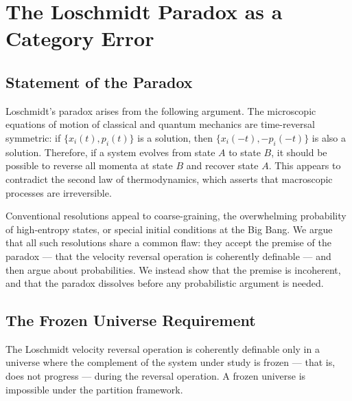 
\section{The Loschmidt Paradox as a Category Error}
\label{sec:loschmidt}

\subsection{Statement of the Paradox}
\label{subsec:paradox_statement}

Loschmidt's paradox arises from the following argument. The microscopic equations
of motion of classical and quantum mechanics are time-reversal symmetric: if
$\{x_i(t), p_i(t)\}$ is a solution, then $\{x_i(-t), -p_i(-t)\}$ is also a
solution. Therefore, if a system evolves from state $A$ to state $B$, it should
be possible to reverse all momenta at state $B$ and recover state $A$. This
appears to contradict the second law of thermodynamics, which asserts that
macroscopic processes are irreversible.

Conventional resolutions appeal to coarse-graining, the overwhelming probability
of high-entropy states, or special initial conditions at the Big Bang. We argue
that all such resolutions share a common flaw: they accept the premise of the
paradox --- that the velocity reversal operation is coherently definable --- and
then argue about probabilities. We instead show that the premise is incoherent,
and that the paradox dissolves before any probabilistic argument is needed.

\subsection{The Frozen Universe Requirement}
\label{subsec:frozen}

\begin{theorem}
\label{thm:frozen}
The Loschmidt velocity reversal operation is coherently definable only in a
universe where the complement of the system under study is frozen --- that is,
does not progress --- during the reversal operation. A frozen universe is
impossible under the partition framework.
\end{theorem}


